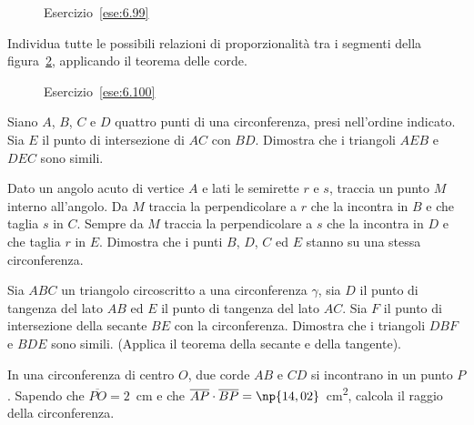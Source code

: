 \begin{inaccessibleblock}
 \begin{figure}[!htb]
	\centering
	\caption{Esercizio~\ref{ese:6.99}}\label{fig:ese6.99}
\end{figure}
\end{inaccessibleblock}

\begin{esercizio}
\label{ese:6.100}
Individua tutte le possibili relazioni di proporzionalità tra i 
segmenti della figura~\ref{fig:ese6.100}, applicando il teorema delle 
corde.
\end{esercizio}


\begin{inaccessibleblock}
 \begin{figure}[!htb]
	\centering
	\caption{Esercizio~\ref{ese:6.100}}\label{fig:ese6.100}
\end{figure}
\end{inaccessibleblock}

\begin{esercizio}
\label{ese:6.101}
Siano $A$, $B$, $C$ e $D$ quattro punti di una circonferenza, presi 
nell'ordine indicato. Sia $E$ il punto di intersezione di $AC$ con 
$BD$. Dimostra che i triangoli $AEB$ e $DEC$ sono simili.
\end{esercizio}

\begin{esercizio}
\label{ese:6.102}
Dato un angolo acuto di vertice $A$ e lati le semirette $r$ e $s$, 
traccia un punto $M$ interno all'angolo. Da $M$ traccia la 
perpendicolare a $r$ che la incontra in $B$ e che taglia $s$ in $C$. 
Sempre da $M$ traccia la perpendicolare a $s$ che la incontra in $D$ 
e che taglia $r$ in $E$. Dimostra che i punti $B$, $D$, $C$ ed $E$ 
stanno su una stessa circonferenza. 
\end{esercizio}

\begin{esercizio}
\label{ese:6.103}
Sia $ABC$ un triangolo circoscritto a una circonferenza $\gamma$, sia 
$D$ il punto di tangenza del lato $AB$ ed $E$ il punto di tangenza 
del lato $AC$. Sia $F$ il punto di intersezione della secante $BE$ con 
la circonferenza. Dimostra che i triangoli $DBF$ e $BDE$ sono simili. 
(Applica il teorema della secante e della tangente).
\end{esercizio}

\begin{esercizio}
\label{ese:6.104}
In una circonferenza di centro $O$, due corde $AB$ e $CD$ si 
incontrano in un punto $P$. Sapendo che $\overline{PO}=2$~cm e che 
$\overline{AP}\cdot \overline{BP}=\np{14,02}$~cm\textsuperscript{2}, 
calcola il raggio della circonferenza.
\end{esercizio}

